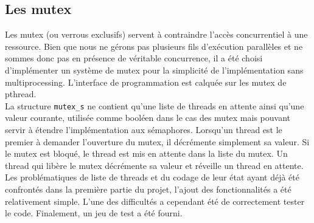 \subsection{Les mutex}

Les mutex (ou verrous exclusifs) servent à contraindre l'accès concurrentiel à une ressource. Bien que nous ne gérons pas plusieurs fils d'exécution parallèles et ne sommes donc pas en présence de véritable concurrence, il a été choisi d'implémenter un système de mutex pour la simplicité de l'implémentation sans multiprocessing. L'interface de programmation est calquée sur les mutex de pthread.
\\

La structure \texttt{mutex\_s} ne contient qu'une liste de threads en attente ainsi qu'une valeur courante, utilisée comme booléen dans le cas des mutex mais pouvant servir à étendre l'implémentation aux sémaphores. Lorsqu'un thread est le premier à demander l'ouverture du mutex, il décrémente simplement sa valeur. Si le mutex est bloqué, le thread est mis en attente dans la liste du mutex. Un thread qui libère le mutex décrémente sa valeur et réveille un thread en attente.
\\

Les problématiques de liste de threads et du codage de leur état ayant déjà été confrontés dans la première partie du projet, l'ajout des fonctionnalités a été relativement simple. L'une des difficultés a cependant été de correctement tester le code. Finalement, un jeu de test a été fourni.
